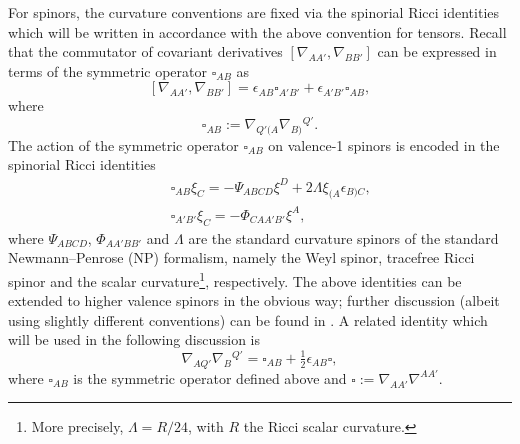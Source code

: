 \documentclass[10pt,a4paper]{article}
\theoremstyle{plain}
\begin{document}
For spinors, the curvature conventions are fixed via the spinorial
Ricci identities which will be written in accordance with the above
convention for tensors.  Recall that the commutator of
covariant derivatives $[ \nabla_{AA'},\nabla_{BB'}]$ can be expressed
in terms of the symmetric operator $\square_{AB}$ as
\[
[ \nabla_{AA'},\nabla_{BB'}]= \epsilon_{AB}\square_{A'B'} +
\epsilon_{A'B'}\square_{AB},
\]
where
\[
\square_{AB} := \nabla_{Q'(A} \nabla_{B)}{}^{Q'}.
\]
 The action of the symmetric operator $\square_{AB}$ on valence-1
 spinors is encoded in the spinorial Ricci identities
\begin{subequations}
\begin{eqnarray}
&& \square_{AB}\xi_{C}=-\Psi_{ABCD} \xi^{D} +
  2\Lambda\xi_{(A}\epsilon_{B)C},
 \label{SpinorialRicciIdentities1} \\
&& \square_{A'B'}\xi_{C}=-\Phi_{CA A' B'}\xi^{A},
\label{SpinorialRicciIdentities2}
\end{eqnarray}
\end{subequations}
where $\Psi_{ABCD}$, $\Phi_{AA'BB'}$ and $\Lambda$ are the standard curvature spinors of the standard Newmann--Penrose (NP) formalism, namely the Weyl spinor, tracefree Ricci spinor and the scalar curvature\footnote{More precisely, $\Lambda=R/24$, with $R$ the Ricci scalar curvature.}, respectively.  The above identities can be extended to higher valence
spinors in the obvious way; further discussion (albeit using
slightly different conventions) can be found in \cite{Ste91}. A
related identity which will be used in the following
discussion is
\begin{equation}\label{DecomposeDoubleDerivativeContracted}
\nabla_{AQ'}\nabla_{B}{}^{Q'}=\square_{AB}+
\tfrac{1}{2}\epsilon_{AB}\square,
\end{equation}
where $\square_{AB}$ is the symmetric operator defined above and
$\square := \nabla_{AA'}\nabla^{AA'}.$
\medskip 
\end{document}
